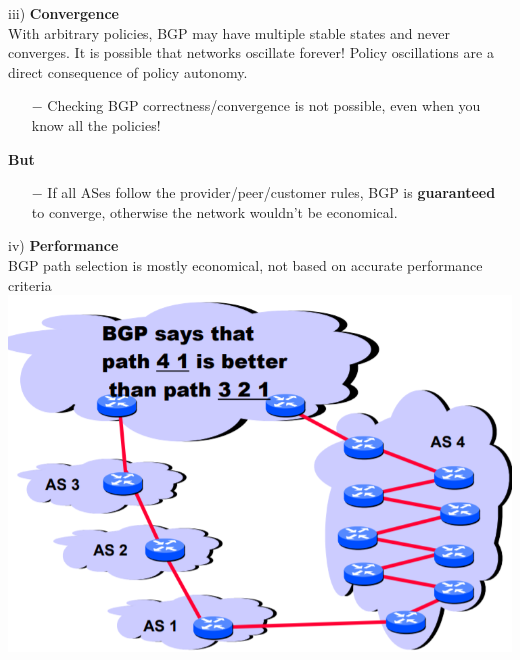 \documentclass[a4paper, fontsize=8pt, landscape, DIV=1]{scrartcl}
\begin{document}
\begin{multicols*}{4}
		iii) \textbf{Convergence}\\
		With arbitrary policies, BGP may have multiple stable states and never converges. It is possible that networks oscillate forever! Policy oscillations are a direct consequence of policy autonomy.
		\begin{itemize}[noitemsep]
			\item[$-$] Checking BGP correctness/convergence is not possible, even when you know all the policies!
		\end{itemize}
		\textbf{But}
		\begin{itemize}[noitemsep]
			\item[$-$] If all ASes follow the provider/peer/customer rules, BGP is \textbf{guaranteed} to converge, otherwise the network wouldn't be economical. 
		\end{itemize}
		\par 
		iv) \textbf{Performance}\\
		BGP path selection is mostly economical, not based on accurate performance criteria
		\includegraphics[width=\columnwidth]{images/Network_Layer/BGP_performance.png}
		\par 
		

\end{multicols*}
\end{document}
